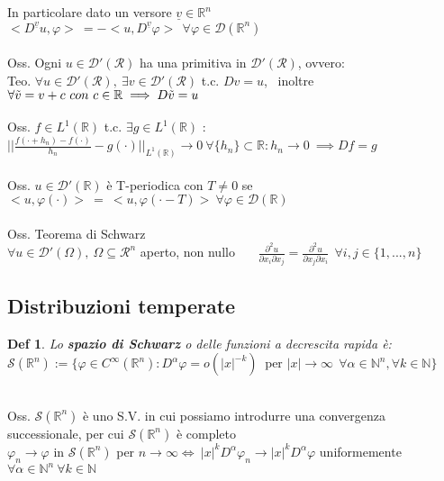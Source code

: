 \documentclass{article}
\theoremstyle{unnumbered}
\newtheorem* {theoremT}{Def}
\theoremstyle{unnumbered1}
\newenvironment{defi}{\begin{gBox}\begin{theoremT}}{\end{theoremT}\end{gBox}}
\renewcommand{\phi}{\varphi}
\begin{document}
\phantom{• \ }In particolare dato un versore $\underline{v}\in\mathbb{R}^n$ \ \ $<D^{\underline{v}}u,\phi>\ =-<u,D^{\underline{v}}\phi> \ \ \forall\phi\in\mathcal{D}(\mathbb{R}^n)$ \\ \\
%
Oss. Ogni $u\in\mathcal{D}'(\mathcal{R})$ ha una primitiva in $\mathcal{D}'(\mathcal{R})$, ovvero:\\
Teo. $\forall u\in\mathcal{D}'(\mathcal{R}), \ \exists v\in\mathcal{D}'(\mathcal{R})$ t.c. $Dv=u$, \ inoltre $\forall \Tilde{v}=v+c \ con \ c\in\mathbb{R} \implies D\Tilde{v}=u$\\ \\
%
%
Oss. $f\in L^1(\mathbb{R})$ t.c. $\exists g\in L^1(\mathbb{R})$ : $||\frac{f(\cdot +h_n)-f(\cdot)}{h_n}-g(\cdot)||_{L^1(\mathbb{R})}\to 0  \ \forall\{h_n\}\subset\mathbb{R} : h_n\to 0 \ \implies Df=g$\\ \\
%
Oss. $u\in\mathcal{D}'(\mathbb{R})$ è T-periodica con $T\ne 0$ se $<u,\phi(\cdot)>\ =\ <u,\phi(\cdot-T)> \ \forall\phi\in\mathcal{D}(\mathbb{R})$ \\ \\
%
%
Oss. Teorema di Schwarz\\
$\forall u\in\mathcal{D}'(\Omega), \ \Omega\subseteq\mathcal{R}^n$ aperto, non nullo \ \ \ $\frac{\partial^2 u}{\partial x_i\partial x_j}=\frac{\partial^2 u}{\partial x_j\partial x_i} \ \ \forall i,j \in\{1,...,n\}$\\



\subsection{Distribuzioni temperate}

\begin{defi}
Lo \textbf{spazio di Schwarz} o delle funzioni a decrescita rapida è:\\ $\mathcal{S}(\mathbb{R}^n):=\{\phi\in C^{\infty}(\mathbb{R}^n): D^{\alpha}\phi= o(|x|^{-k}) \ \text{ per }|x|\to\infty \ \ \forall \alpha \in \mathbb{N}^n, \forall k\in\mathbb{N}\}$
\end{defi}
%
\phantom{}\\
Oss. $\mathcal{S}(\mathbb{R}^n)$ è uno S.V. in cui possiamo introdurre una convergenza successionale, per cui $\mathcal{S}(\mathbb{R}^n)$ è completo \\ $\phi_n\to\phi$ in $\mathcal{S}(\mathbb{R}^n)$ per $n\to\infty \Longleftrightarrow \ |x|^kD^{\alpha}\phi_n\to |x|^kD^{\alpha}\phi$ uniformemente $\forall \alpha\in\mathbb{N}^n \ \forall k\in \mathbb{N}$\\
\end{document}
